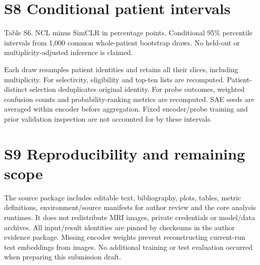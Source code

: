 \documentclass[10pt]{article}
\begin{document}
\clearpage
\section*{S8  Conditional patient intervals}
\begin{center}
\par\small Table S6. NCL minus SimCLR in percentage points. Conditional 95\% percentile intervals from 1,000 common whole-patient bootstrap draws. No held-out or multiplicity-adjusted inference is claimed.
\end{center}
Each draw resamples patient identities and retains all their slices, including multiplicity. For selectivity, eligibility and top-ten lists are recomputed. Patient-distinct selection deduplicates original identity. For probe outcomes, weighted confusion counts and probability-ranking metrics are recomputed. SAE seeds are averaged within encoder before aggregation. Fixed encoder/probe training and prior validation inspection are not accounted for by these intervals.

\section*{S9  Reproducibility and remaining scope}
The source package includes editable text, bibliography, plots, tables, metric definitions, environment/source manifests for author review and the core analysis runtimes. It does not redistribute MRI images, private credentials or model/data archives. All input/result identities are pinned by checksums in the author evidence package. Missing encoder weights prevent reconstructing current-run test embeddings from images. No additional training or test evaluation occurred when preparing this submission draft.
\end{document}

